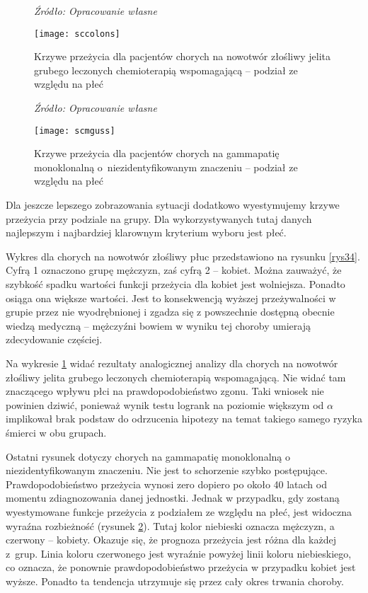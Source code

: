 \documentclass[licencjacka]{pwr_wmat_praca_dyplomowa}
\theoremstyle{plain}
\numberwithin{theorem}{chapter}
\theoremstyle{definition}
\numberwithin{theorem}{chapter}
\begin{document}
\begin{figure}[!b]
	\caption*{\textit{Źródło: Opracowanie własne}}
	\centering
	\texttt{[image: sccolons]}
	\caption{Krzywe przeżycia dla pacjentów chorych na nowotwór złośliwy jelita grubego leczonych chemioterapią wspomagającą  -- podział ze względu na płeć}\label{rys35}
	
	
	
\end{figure}




\begin{figure}[!tb]
	\caption*{\textit{Źródło: Opracowanie własne}}
	\centering
	\texttt{[image: scmguss]}
	\caption{Krzywe przeżycia dla pacjentów chorych na gammapatię monoklonalną o~niezidentyfikowanym znaczeniu -- podział ze względu na płeć}\label{rys36}
	
\end{figure}

Dla jeszcze lepszego zobrazowania sytuacji dodatkowo wyestymujemy krzywe przeżycia przy podziale na grupy. Dla wykorzystywanych tutaj danych najlepszym i najbardziej klarownym kryterium wyboru jest płeć.

Wykres dla chorych na nowotwór złośliwy płuc przedstawiono na rysunku \ref{rys34}. Cyfrą 1 oznaczono grupę mężczyzn, zaś cyfrą 2 -- kobiet. Można zauważyć, że szybkość spadku wartości funkcji przeżycia dla kobiet jest wolniejsza. Ponadto osiąga ona większe wartości. Jest to konsekwencją wyższej przeżywalności w grupie przez nie wyodrębnionej i zgadza się z powszechnie dostępną obecnie wiedzą medyczną -- mężczyźni bowiem w wyniku tej choroby umierają zdecydowanie częściej.

Na wykresie \ref{rys35} widać rezultaty analogicznej analizy dla chorych na nowotwór złośliwy jelita grubego leczonych chemioterapią wspomagającą. Nie widać tam znaczącego wpływu płci na prawdopodobieństwo zgonu. Taki wniosek nie powinien dziwić, ponieważ wynik testu logrank na poziomie większym od $\alpha$ implikował brak podstaw do odrzucenia hipotezy na temat takiego samego ryzyka śmierci w obu grupach.

Ostatni rysunek dotyczy chorych na gammapatię monoklonalną o niezidentyfikowanym znaczeniu.  Nie jest to schorzenie szybko postępujące. Prawdopodobieństwo przeżycia wynosi zero dopiero po około 40 latach od momentu zdiagnozowania danej jednostki. Jednak w przypadku, gdy zostaną wyestymowane funkcje przeżycia z podziałem ze względu na płeć, jest widoczna wyraźna rozbieżność (rysunek \ref{rys36}). Tutaj kolor niebieski oznacza mężczyzn, a czerwony -- kobiety. Okazuje się, że prognoza przeżycia jest różna dla każdej z~grup. Linia koloru czerwonego jest wyraźnie powyżej linii koloru niebieskiego, co oznacza, że ponownie prawdopodobieństwo przeżycia w przypadku kobiet jest wyższe. Ponadto ta tendencja utrzymuje się przez cały okres trwania choroby.
\end{document}
